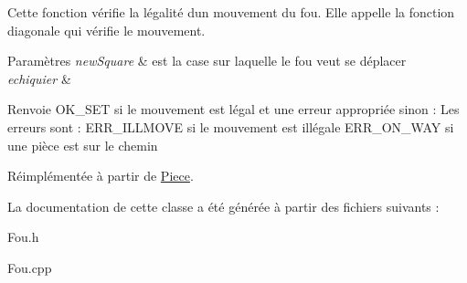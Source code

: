 Cette fonction vérifie la légalité d\textquotesingle{}un mouvement du fou. Elle appelle la fonction diagonale qui vérifie le mouvement. 


\begin{DoxyParams}{Paramètres}
{\em new\+Square} & est la case sur laquelle le fou veut se déplacer \\
\hline
{\em echiquier} & \\
\hline
\end{DoxyParams}
\begin{DoxyReturn}{Renvoie}
O\+K\+\_\+\+S\+ET si le mouvement est légal et une erreur appropriée sinon \+: Les erreurs sont \+: E\+R\+R\+\_\+\+I\+L\+L\+M\+O\+VE si le mouvement est illégale E\+R\+R\+\_\+\+O\+N\+\_\+\+W\+AY si une pièce est sur le chemin 
\end{DoxyReturn}


Réimplémentée à partir de \hyperlink{classPiece_a7003f6b90284237191f00bb6038a3bd3}{Piece}.



La documentation de cette classe a été générée à partir des fichiers suivants \+:\begin{DoxyCompactItemize}
\item 
Fou.\+h\item 
Fou.\+cpp\end{DoxyCompactItemize}
